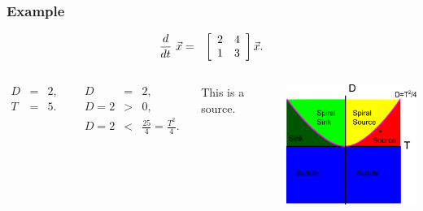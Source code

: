 \begin{frame}
  \frametitle{Example}

  \begin{eqnarray*}
    \deriv{~}{t} \vec{x} & = & \arrayTwo{2}{4}{1}{3} \vec{x}.
  \end{eqnarray*}

  \begin{columns}

  {
    \begin{eqnarray*}
      D & = & 2, \\
      T & = & 5.
    \end{eqnarray*}
  }

  {
    \begin{eqnarray*}
      D & = & 2, \\
      D=2 & > & 0, \\
      D = 2 & < & \frac{25}{4} = \frac{T^2}{4}.
    \end{eqnarray*}
  }

  {
    This is a source.
    
    \centerline{\includegraphics[width=5cm]{img/traceDeterminantExample1}}
  }
  \end{columns}

\end{frame}


